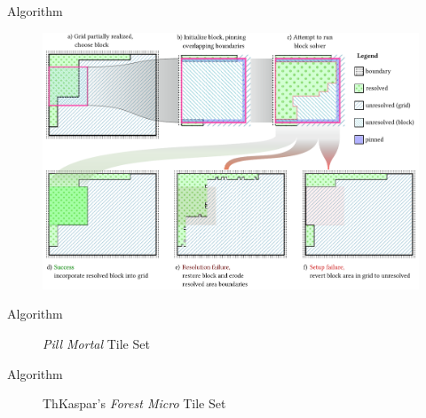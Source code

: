 \documentclass{beamer}
\begin{document}
  \begin{frame}[fragile]{Algorithm}
    \begin{figure}
      \includegraphics[width=\textwidth]{figs/poms_figalg.pdf}
    \end{figure}
  \end{frame}

  \begin{frame}[fragile]{Algorithm}
    \begin{figure}
      \textit{Pill Mortal} Tile Set

    \end{figure}
  \end{frame}

%

  \begin{frame}[fragile]{Algorithm}

    \begin{figure}
      ThKaspar's \textit{Forest Micro} Tile Set

    \end{figure}
  \end{frame}
\end{document}
